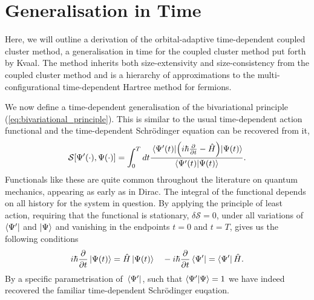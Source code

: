\section{Generalisation in Time}

Here, we will outline a derivation of the orbital-adaptive time-dependent coupled cluster 
method, a generalisation in time for the coupled cluster method put forth by 
Kvaal\cite{kvaal2012ab}. The method inherits both size-extensivity and size-consistency from 
the coupled cluster method and is a hierarchy of approximations to the multi-configurational 
time-dependent Hartree method for fermions.

We now define a time-dependent generalisation of the bivariational principle
(\autoref{eq:bivariational_principle}). This is similar to the usual time-dependent 
action functional and the time-dependent Schrödinger equation can be recovered from 
it,
\begin{equation}
    \label{eq:time_dependent_action_functional}
    \mathcal{S}[{\Psi}'(\cdot), \Psi(\cdot)]
        = \int_0^T dt \frac{\mel{{\Psi}'(t)}{\left(
            i\hbar \frac{\partial}{\partial t} - \hat{H}
        \right)}{\Psi(t)}}{\braket{{\Psi}'(t)}{\Psi(t)}}.
\end{equation}
Functionals like these are quite common throughout the literature on 
quantum mechanics, appearing as early as in Dirac\cite{dirac1930principles}. The 
integral of the functional depends on all history for the system in question. 
By applying the principle of least action, 
requiring that the functional is stationary, $\delta\mathcal{S} = 0$, under all variations 
of $\bra{{\Psi}'}$ and $\ket{\Psi}$ and vanishing in the endpoints $t=0$ and
$t=T$, gives us the following conditions
\begin{equation*}
    i\hbar\frac{\partial}{\partial t} \ket{\Psi(t)} = \hat{H}\ket{\Psi(t)}
    \quad -i \hbar \frac{\partial}{\partial t} \bra{{\Psi}'} = \bra{{\Psi}'}\hat{H}.
\end{equation*}
By a specific parametrisation of $\bra*{{\Psi}'}$, such that 
$\braket{{\Psi}'}{\Psi} = 1$ we have indeed recovered the familiar 
time-dependent Schrödinger euqation.

